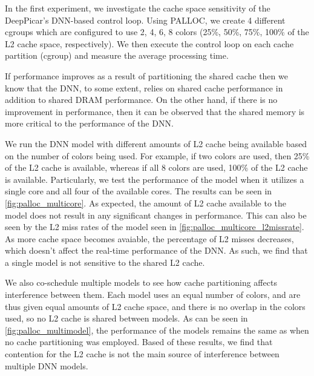 In the first experiment, we investigate the cache space sensitivity of
the DeepPicar's DNN-based control loop. Using PALLOC, we create 4
different cgroups which are configured to use 2, 4,
6, 8 colors (25\%, 50\%, 75\%, 100\% of the L2 cache
space, respectively). We then execute the control loop on each cache
partition (cgroup) and measure the average processing time. 

If performance improves as a result of partitioning the shared cache 
then we know that the DNN, to some extent, relies on shared cache 
performance in addition to shared DRAM performance. On the other 
hand, if there is no improvement in performance, then it can be 
observed that the shared memory is more critical to the performance 
of the DNN.

We run the DNN model with different amounts of L2 cache being
available based on the number of colors being used. For example, if two 
colors are used, then 25\% of the L2 cache is available, whereas if all 
8 colors are used, 100\% of the L2 cache is available. Particularly, we 
test the performance of the model when it utilizes a single core and
all four of the available cores. The results can be seen in 
\ref{fig:palloc_multicore}. As expected, the amount of L2 cache 
available to the model does not result in any significant changes in 
performance. This can also be seen by the L2 miss rates of the model 
seen in \ref{fig:palloc_multicore_l2missrate}. As more cache space 
becomes avaiable, the percentage of L2 misses decreases, which doesn't 
affect the real-time performance of the DNN. As such, we find that a 
single model is not sensitive to the shared L2 cache.

We also co-schedule multiple models to see how cache partitioning affects
interference between them. Each model uses an equal number of colors, and
are thus given equal amounts of L2 cache space, and there is no overlap
in the colors used, so no L2 cache is shared between models. As can be 
seen in \ref{fig:palloc_multimodel}, the performance of the models 
remains the same as when no cache partitioning was employed. Based of 
these results, we find that contention for the L2 cache is not the main
source of interference between multiple DNN models.

